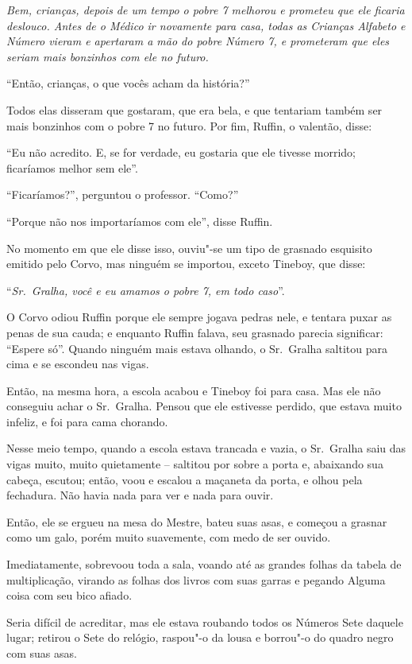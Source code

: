 \emph{Bem, crianças, depois de um tempo o pobre 7 melhorou e prometeu
que ele ficaria deslouco. Antes de o Médico ir novamente para casa,
todas as Crianças Alfabeto e Número vieram e apertaram a mão do pobre
Número 7, e prometeram que eles seriam mais bonzinhos com ele no
futuro.}

``Então, crianças, o que vocês acham da história?''

Todos elas disseram que gostaram, que era bela, e que tentariam também
ser mais bonzinhos com o pobre 7 no futuro. Por fim, Ruffin, o valentão,
disse:

``Eu não acredito. E, se for verdade, eu gostaria que ele tivesse
morrido; ficaríamos melhor sem ele''.

``Ficaríamos?'', perguntou o professor. ``Como?''

``Porque não nos importaríamos com ele'', disse Ruffin.

No momento em que ele disse isso, ouviu"-se um tipo de grasnado esquisito
emitido pelo Corvo, mas ninguém se importou, exceto Tineboy, que disse:

``\emph{Sr.~Gralha, você e eu amamos o pobre 7, em todo caso}''.

O Corvo odiou Ruffin porque ele sempre jogava pedras nele, e tentara
puxar as penas de sua cauda; e enquanto Ruffin falava, seu grasnado
parecia significar: ``Espere só''. Quando ninguém mais estava olhando, o
Sr.~Gralha saltitou para cima e se escondeu nas vigas.

Então, na mesma hora, a escola acabou e Tineboy foi para casa. Mas ele
não conseguiu achar o Sr.~Gralha. Pensou que ele estivesse perdido, que
estava muito infeliz, e foi para cama chorando.

Nesse meio tempo, quando a escola estava trancada e vazia, o Sr.~Gralha
saiu das vigas muito, muito quietamente -- saltitou por sobre a porta e,
abaixando sua cabeça, escutou; então, voou e escalou a maçaneta da
porta, e olhou pela fechadura. Não havia nada para ver e nada para
ouvir.

Então, ele se ergueu na mesa do Mestre, bateu suas asas, e começou a
grasnar como um galo, porém muito suavemente, com medo de ser ouvido.

Imediatamente, sobrevoou toda a sala, voando até as grandes folhas da
tabela de multiplicação, virando as folhas dos livros com suas garras e
pegando Alguma coisa com seu bico afiado.

Seria difícil de acreditar, mas ele estava roubando todos os Números
Sete daquele lugar; retirou o Sete do relógio, raspou"-o da lousa e
borrou"-o do quadro negro com suas asas.

